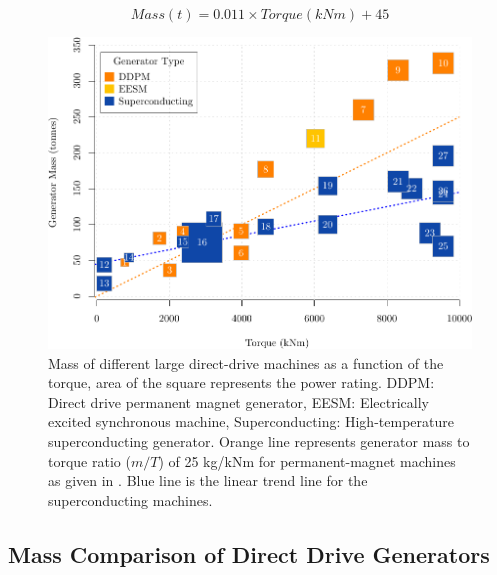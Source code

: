 \documentclass[12pt]{iopart}
\begin{document}
 \begin{equation}
     Mass(t)=0.011\times Torque(kNm)+45
     \label{mass_torque_eq}
 \end{equation}

\begin{figure}[t]
\centering
\includegraphics[]{generator_mass_compare}
\caption{Mass of different large direct-drive machines as a function of the torque, area of the square represents the power rating.
 DDPM: Direct drive permanent magnet generator, EESM: Electrically excited synchronous machine, Superconducting: High-temperature superconducting generator. Orange line represents generator mass to torque ratio ($m/T$) of 25 kg/kNm for permanent-magnet machines as given in \cite{Bang2008}. Blue line is the linear trend line for the superconducting machines.}
\label{generators_mass_comparison}
\end{figure}

 \subsection{Mass Comparison of Direct Drive Generators}
 \label{mass-comparison-section}
\end{document}
